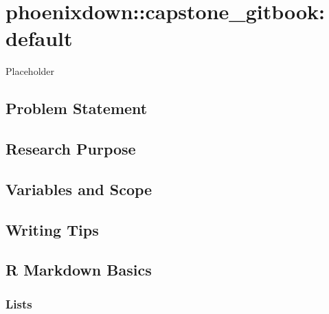 \documentclass[12pt,oneside]{chicagocapstone}
\begin{document}
  \listoftables


\mainmatter %
\pagestyle{fancyplain} %

\hypertarget{phoenixdowncapstone_gitbook-default}{%
\chapter{phoenixdown::capstone\_gitbook: default}\label{phoenixdowncapstone_gitbook-default}}

Placeholder

\hypertarget{problem-statement}{%
\section*{Problem Statement}\label{problem-statement}}

\hypertarget{research-purpose}{%
\section*{Research Purpose}\label{research-purpose}}

\hypertarget{variables-and-scope}{%
\section*{Variables and Scope}\label{variables-and-scope}}

\hypertarget{writing-tips}{%
\section*{Writing Tips}\label{writing-tips}}

\hypertarget{rmd-basics}{%
\section*{R Markdown Basics}\label{rmd-basics}}

\hypertarget{lists}{%
\subsection*{Lists}\label{lists}}
\end{document}
